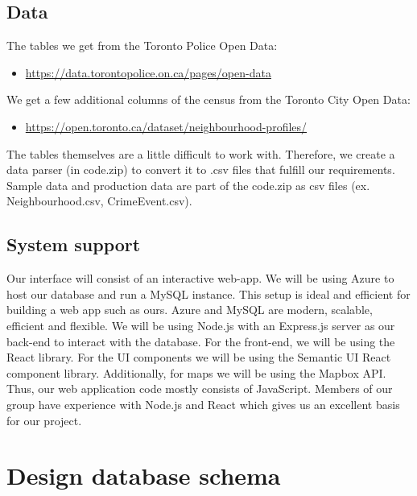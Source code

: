 \documentclass[12pt, a4paper]{article}
\begin{document}
\subsection*{Data}
The tables we get from the Toronto Police Open Data:
\begin{itemize}
    \item \url{https://data.torontopolice.on.ca/pages/open-data}
\end{itemize}
We get a few additional columns of the census from the Toronto City Open Data:
\begin{itemize}
 \item \url{https://open.toronto.ca/dataset/neighbourhood-profiles/}
\end{itemize}
The tables themselves are a little difficult to work with. Therefore, we create a data parser (in code.zip) to convert it to .csv files that fulfill our requirements. Sample data and production data are part of the code.zip as csv files (ex. Neighbourhood.csv, CrimeEvent.csv).
\subsection*{System support}
Our interface will consist of an interactive web-app. We will be using Azure to host our database and run a MySQL instance. This setup is ideal and efficient for building a web app such as ours. Azure and MySQL are modern, scalable, efficient and flexible. We will be using Node.js with an Express.js server as our back-end to interact with the database. For the front-end, we will be using the React library. For the UI components we will be using the Semantic UI React component library. Additionally, for maps we will be using the Mapbox API. Thus, our web application code mostly consists of JavaScript. Members of our group have experience with Node.js and React which gives us an excellent basis for our project. 

\section*{Design database schema}
\end{document}
